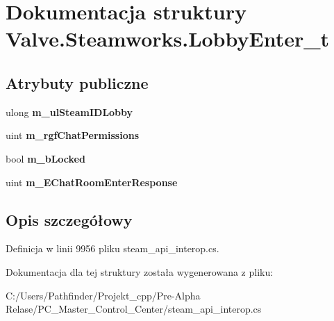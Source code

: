 \hypertarget{struct_valve_1_1_steamworks_1_1_lobby_enter__t}{}\section{Dokumentacja struktury Valve.\+Steamworks.\+Lobby\+Enter\+\_\+t}
\label{struct_valve_1_1_steamworks_1_1_lobby_enter__t}
\subsection*{Atrybuty publiczne}
\begin{DoxyCompactItemize}
\item 
\mbox{\label{struct_valve_1_1_steamworks_1_1_lobby_enter__t_a73106b265181ab19c61ab6e9607ce51f}} 
ulong {\bfseries m\+\_\+ul\+Steam\+I\+D\+Lobby}
\item 
\mbox{\label{struct_valve_1_1_steamworks_1_1_lobby_enter__t_a598c68b084c439a075a259d62105b024}} 
uint {\bfseries m\+\_\+rgf\+Chat\+Permissions}
\item 
\mbox{\label{struct_valve_1_1_steamworks_1_1_lobby_enter__t_a5eff994355b5449a3c9de9f049b817e2}} 
bool {\bfseries m\+\_\+b\+Locked}
\item 
\mbox{\label{struct_valve_1_1_steamworks_1_1_lobby_enter__t_a9d73bce07c462fe61d8e09cad3a922c6}} 
uint {\bfseries m\+\_\+\+E\+Chat\+Room\+Enter\+Response}
\end{DoxyCompactItemize}


\subsection{Opis szczegółowy}


Definicja w linii 9956 pliku steam\+\_\+api\+\_\+interop.\+cs.



Dokumentacja dla tej struktury została wygenerowana z pliku\+:\begin{DoxyCompactItemize}
\item 
C\+:/\+Users/\+Pathfinder/\+Projekt\+\_\+cpp/\+Pre-\/\+Alpha Relase/\+P\+C\+\_\+\+Master\+\_\+\+Control\+\_\+\+Center/steam\+\_\+api\+\_\+interop.\+cs\end{DoxyCompactItemize}
